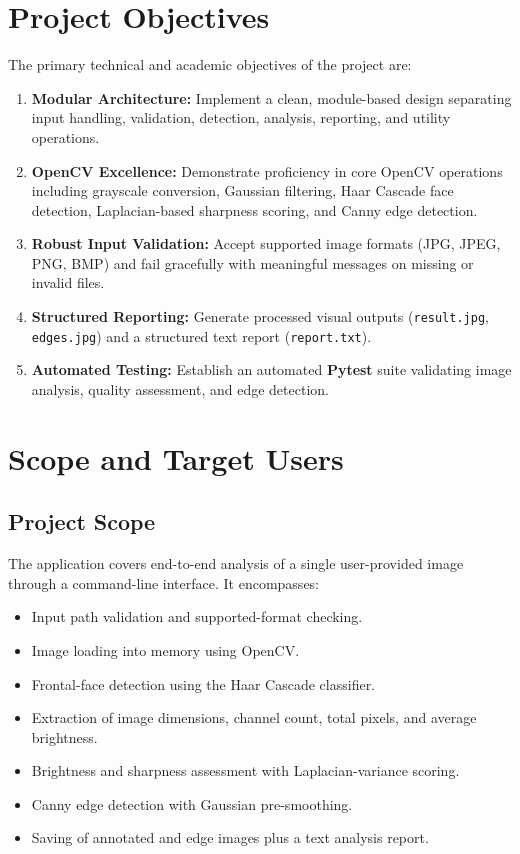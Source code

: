 \documentclass[11pt,a4paper]{article}
\begin{document}
\section{Project Objectives}
The primary technical and academic objectives of the project are:
\begin{enumerate}[leftmargin=1.5em]
    \item \textbf{Modular Architecture:} Implement a clean, module-based design separating input handling, validation, detection, analysis, reporting, and utility operations.
    \item \textbf{OpenCV Excellence:} Demonstrate proficiency in core OpenCV operations including grayscale conversion, Gaussian filtering, Haar Cascade face detection, Laplacian-based sharpness scoring, and Canny edge detection.
    \item \textbf{Robust Input Validation:} Accept supported image formats (JPG, JPEG, PNG, BMP) and fail gracefully with meaningful messages on missing or invalid files.
    \item \textbf{Structured Reporting:} Generate processed visual outputs (\texttt{result.jpg}, \texttt{edges.jpg}) and a structured text report (\texttt{report.txt}).
    \item \textbf{Automated Testing:} Establish an automated \textbf{Pytest} suite validating image analysis, quality assessment, and edge detection.
\end{enumerate}

\section{Scope and Target Users}

\subsection{Project Scope}
The application covers end-to-end analysis of a single user-provided image through a command-line interface. It encompasses:
\begin{itemize}[leftmargin=1.5em]
    \item Input path validation and supported-format checking.
    \item Image loading into memory using OpenCV.
    \item Frontal-face detection using the Haar Cascade classifier.
    \item Extraction of image dimensions, channel count, total pixels, and average brightness.
    \item Brightness and sharpness assessment with Laplacian-variance scoring.
    \item Canny edge detection with Gaussian pre-smoothing.
    \item Saving of annotated and edge images plus a text analysis report.
\end{itemize}
\end{document}
